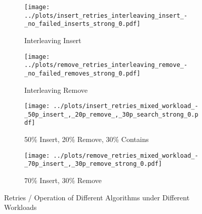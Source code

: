 \begin{figure}[H]
    \centering
    
    \begin{subfigure}[b]{0.49\textwidth}
        \texttt{[image: ../plots/insert\_retries\_interleaving\_insert\_-\_no\_failed\_inserts\_strong\_0.pdf]}
        \caption{Interleaving Insert}
        \label{fig:Scatter:OpenMPI:Rel:31}
    \end{subfigure}
    \begin{subfigure}[b]{0.49\textwidth}
        \texttt{[image: ../plots/remove\_retries\_interleaving\_remove\_-\_no\_failed\_removes\_strong\_0.pdf]}
        \caption{Interleaving Remove}
        \label{fig:Scatter:OpenMPI:Abs:31}
    \end{subfigure}
    
    \begin{subfigure}[b]{0.49\textwidth}
        \texttt{[image: ../plots/insert\_retries\_mixed\_workload\_-\_50p\_insert\_,\_20p\_remove\_,\_30p\_search\_strong\_0.pdf]}
        \caption{50\% Insert, 20\% Remove, 30\% Contains}
        \label{fig:Scatter:OpenMPI:Rel:32}
    \end{subfigure}
    \begin{subfigure}[b]{0.49\textwidth}
        \texttt{[image: ../plots/remove\_retries\_mixed\_workload\_-\_70p\_insert\_,\_30p\_remove\_strong\_0.pdf]}
        \caption{70\% Insert, 30\% Remove}
        \label{fig:Scatter:OpenMPI:Abs:32}
    \end{subfigure}
    
    \caption{Retries / Operation of Different Algorithms under Different Workloads}
\end{figure}